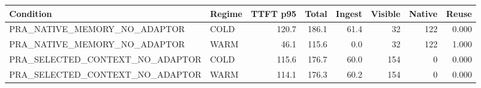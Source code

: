 \begin{tabular}{llrrrrrr}
\toprule
Condition & Regime & TTFT p95 & Total & Ingest & Visible & Native & Reuse \\
\midrule
PRA\_NATIVE\_MEMORY\_NO\_ADAPTOR & COLD & 120.7 & 186.1 & 61.4 & 32 & 122 & 0.000 \\
PRA\_NATIVE\_MEMORY\_NO\_ADAPTOR & WARM & 46.1 & 115.6 & 0.0 & 32 & 122 & 1.000 \\
PRA\_SELECTED\_CONTEXT\_NO\_ADAPTOR & COLD & 115.6 & 176.7 & 60.0 & 154 & 0 & 0.000 \\
PRA\_SELECTED\_CONTEXT\_NO\_ADAPTOR & WARM & 114.1 & 176.3 & 60.2 & 154 & 0 & 0.000 \\
\bottomrule
\end{tabular}
